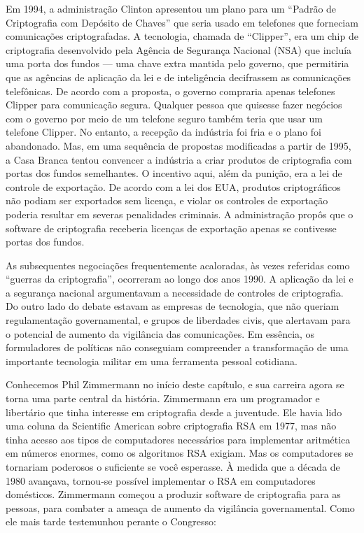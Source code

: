 \documentclass{book}
\begin{document}
Em 1994, a administração Clinton apresentou um plano para um ``Padrão de Criptografia com Depósito de Chaves'' que seria usado em telefones que forneciam comunicações criptografadas. A tecnologia, chamada de ``Clipper'', era um chip de criptografia desenvolvido pela Agência de Segurança Nacional (NSA) que incluía uma porta dos fundos --- uma chave extra mantida pelo governo, que permitiria que as agências de aplicação da lei e de inteligência decifrassem as comunicações telefônicas. De acordo com a proposta, o governo compraria apenas telefones Clipper para comunicação segura. Qualquer pessoa que quisesse fazer negócios com o governo por meio de um telefone seguro também teria que usar um telefone Clipper. No entanto, a recepção da indústria foi fria e o plano foi abandonado. Mas, em uma sequência de propostas modificadas a partir de 1995, a Casa Branca tentou convencer a indústria a criar produtos de criptografia com portas dos fundos semelhantes. O incentivo aqui, além da punição, era a lei de controle de exportação. De acordo com a lei dos EUA, produtos criptográficos não podiam ser exportados sem licença, e violar os controles de exportação poderia resultar em severas penalidades criminais. A administração propôs que o software de criptografia receberia licenças de exportação apenas se contivesse portas dos fundos.

As subsequentes negociações frequentemente acaloradas, às vezes referidas como ``guerras da criptografia'', ocorreram ao longo dos anos 1990. A aplicação da lei e a segurança nacional argumentavam a necessidade de controles de criptografia. Do outro lado do debate estavam as empresas de tecnologia, que não queriam regulamentação governamental, e grupos de liberdades civis, que alertavam para o potencial de aumento da vigilância das comunicações. Em essência, os formuladores de políticas não conseguiam compreender a transformação de uma importante tecnologia militar em uma ferramenta pessoal cotidiana.

Conhecemos Phil Zimmermann no início deste capítulo, e sua carreira agora se torna uma parte central da história. Zimmermann era um programador e libertário que tinha interesse em criptografia desde a juventude. Ele havia lido uma coluna da Scientific American sobre criptografia RSA em 1977, mas não tinha acesso aos tipos de computadores necessários para implementar aritmética em números enormes, como os algoritmos RSA exigiam. Mas os computadores se tornariam poderosos o suficiente se você esperasse. À medida que a década de 1980 avançava, tornou-se possível implementar o RSA em computadores domésticos. Zimmermann começou a produzir software de criptografia para as pessoas, para combater a ameaça de aumento da vigilância governamental. Como ele mais tarde testemunhou perante o Congresso:
\end{document}
